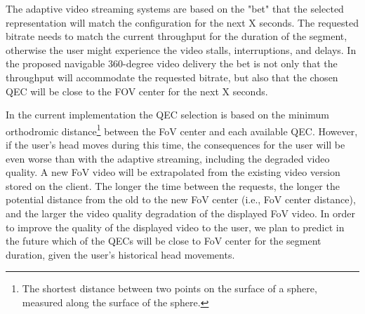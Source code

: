  The adaptive video streaming systems are based on the "bet" that the selected representation will match the configuration for the next X seconds. The requested bitrate needs to match the current throughput for the duration of the segment, otherwise the user might experience the video stalls, interruptions, and delays. In the proposed navigable 360-degree video delivery the bet is not only that the throughput will accommodate the requested bitrate, but also that the chosen QEC will be close to the FOV center for the next X seconds.

 In the current implementation the QEC selection is based on the minimum orthodromic distance\footnote{The shortest distance between two points on the surface of a sphere, measured along the surface of the sphere.} between the FoV center and each available QEC. However, if the user's head moves during this time, the consequences for the user will be even worse than with the adaptive streaming, including the degraded video quality. A new FoV video will be extrapolated from the existing video version stored on the client. The longer the time between the requests, the longer the potential distance from the old to the new FoV center (i.e., FoV center distance), and the larger the video quality degradation of the displayed FoV video. In order to improve the quality of the displayed video to the user, we plan to predict in the future which of the QECs will be close to FoV center for the segment duration, given the user's historical head movements.




